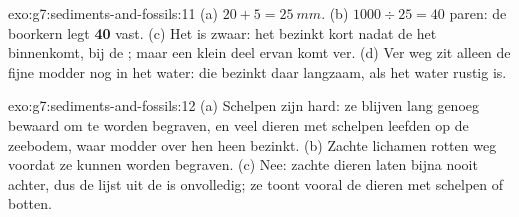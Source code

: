 \begin{solution}{exo:g7:sediments-and-fossils:11}
(a) $20 + 5 = \qty{25}{mm}$. (b) $1000 \div 25 = 40$ paren: de boorkern
legt \textbf{40 } vast. (c) Het  is zwaar: het bezinkt
kort nadat de  het  binnenkomt, bij de ; maar een klein
deel ervan komt ver. (d) Ver weg zit alleen de fijne modder nog in het
water: die bezinkt daar langzaam, als het water rustig is.
\end{solution}

\begin{solution}{exo:g7:sediments-and-fossils:12}
(a) Schelpen zijn hard: ze blijven lang genoeg bewaard om te worden
begraven, en veel dieren met schelpen leefden op de zeebodem, waar modder
over hen heen bezinkt. (b) Zachte lichamen rotten weg voordat ze kunnen
worden begraven. (c) Nee: zachte dieren laten bijna nooit 
achter, dus de lijst uit de  is onvolledig; ze toont vooral de
dieren met schelpen of botten.
\end{solution}

